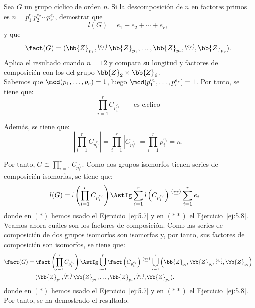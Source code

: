 \begin{ejercicio}\label{ej:5.9}
    Sea $G$ un grupo cíclico de orden $n$. Si la descomposición de $n$ en factores primos es $n = p_1^{e_1} p_2^{e_2} \cdots p_r^{e_r}$, demostrar que
    \[
        l(G) = e_1 + e_2 + \cdots + e_r,
    \]
    y que
    \[
        \fact(G) = (\bb{Z}_{p_1}, \stackrel{(e_1)}{\ldots}\bb{Z}_{p_1}, \dots, \bb{Z}_{p_r},\stackrel{(e_r)}{\ldots}, \bb{Z}_{p_r}).
    \]
    Aplica el resultado cuando $n = 12$ y compara su longitud y factores de composición con los del grupo $\bb{Z}_2 \times \bb{Z}_6$.\\

    Sabemos que $\mcd(p_1,\dots,p_r)=1$, luego $\mcd(p_1^{e_1},\dots,p_r^{e_r})=1$. Por tanto, se tiene que:
    \begin{equation*}
        \prod_{i=1}^{r} C_{p_i^{e_i}}\qquad \text{es cíclico}
    \end{equation*}

    Además, se tiene que:
    \begin{equation*}
        \left|\prod_{i=1}^{r} C_{p_i^{e_i}}\right| = \prod_{i=1}^{r} |C_{p_i^{e_i}}| = \prod_{i=1}^{r} p_i^{e_i} = n.
    \end{equation*}

    Por tanto, $G\cong \prod\limits_{i=1}^{r} C_{p_i^{e_i}}$. Como dos grupos isomorfos tienen series de composición isomorfas, se tiene que:
    \begin{align*}
        l(G) &= l\left(\prod_{i=1}^{r} C_{p_i^{e_i}}\right) 
        \AstIg \sum_{i=1}^{r} l\left(C_{p_i^{e_i}}\right) 
        \stackrel{(\ast\ast)}{=} \sum_{i=1}^{r} e_i
    \end{align*}
    donde en $(\ast)$ hemos usado el Ejercicio~\ref{ej:5.7} y en $(\ast\ast)$ el Ejercicio~\ref{ej:5.8}.\\

    Veamos ahora cuáles son los factores de composición. Como las series de composición de dos grupos isomorfos son isomorfas y, por tanto, sus factores de composición son isomorfos, se tiene que:
    \begin{align*}
        \fact(G) &= \fact\left(\prod_{i=1}^{r} C_{p_i^{e_i}}\right) 
        \AstIg \bigcup_{i=1}^{r} \fact\left(C_{p_i^{e_i}}\right) 
        \stackrel{(\ast\ast)}{=} \bigcup_{i=1}^{r} \left(\bb{Z}_{p_i}, \bb{Z}_{p_i}, \stackrel{(e_i)}{\ldots}, \bb{Z}_{p_i}\right)\\
        &= (\bb{Z}_{p_1}, \stackrel{(e_1)}{\ldots}\bb{Z}_{p_1}, \dots, \bb{Z}_{p_r},\stackrel{(e_r)}{\ldots}, \bb{Z}_{p_r}).
    \end{align*}
    donde en $(\ast)$ hemos usado el Ejercicio~\ref{ej:5.7} y en $(\ast\ast)$ el Ejercicio~\ref{ej:5.8}. Por tanto, se ha demostrado el resultado.\\


\end{ejercicio}
